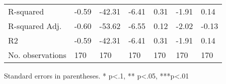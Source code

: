 \begin{table}
\begin{center}
\begin{tabular}{lllllll}
R-squared                   & -0.59        & -42.31       & -6.41        & 0.31         & -1.91        & 0.14          \\
R-squared Adj.              & -0.60        & -53.62       & -6.55        & 0.12         & -2.02        & -0.13         \\
R2                          & -0.59        & -42.31       & -6.41        & 0.31         & -1.91        & 0.14          \\
No. observations            & 170          & 170          & 170          & 170          & 170          & 170           \\
\hline
\end{tabular}
\end{center}
\end{table}
\bigskip
Standard errors in parentheses. \newline 
* p<.1, ** p<.05, ***p<.01